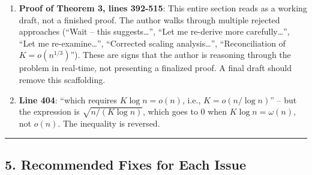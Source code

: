 \documentclass[
  12pt,
]{ctexart}
\begin{document}
\begin{enumerate}
  \textbf{Line 285}: The author writes ``For a fixed true center
  \(\mu_k\), let \(j^*(k) = \arg\min_j \|\mu_k - \mu_j'\|_2\)'' -- but
  this ignores that the \(k\)-means assignment is based on
  \(\|\phi(x) - \mu_j'\|_2 = \|\mu_k + \varepsilon - \mu_j'\|_2\), not
  \(\|\mu_k - \mu_j'\|_2\). The argmin depends on \(\varepsilon\), so
  fixing \(j^*\) independent of \(\varepsilon\) is incorrect.
\item
  \textbf{Proof of Theorem 3, lines 392-515}: This entire section reads
  as a working draft, not a finished proof. The author walks through
  multiple rejected approaches (``Wait -- this suggests\ldots{}'', ``Let
  me re-derive more carefully\ldots{}'', ``Let me re-examine\ldots{}'',
  ``Corrected scaling analysis\ldots{}'', ``Reconciliation of
  \(K = o(n^{1/3})\)''). These are signs that the author is reasoning
  through the problem in real-time, not presenting a finalized proof. A
  final draft should remove this scaffolding.
\item
  \textbf{Line 404}: ``which requires \(K \log n = o(n)\), i.e.,
  \(K = o(n / \log n)\)'' -- but the expression is
  \(\sqrt{n/(K \log n)}\), which goes to 0 when
  \(K \log n = \omega(n)\), not \(o(n)\). The inequality is reversed.
\end{enumerate}

\begin{center}\rule{0.5\linewidth}{0.5pt}\end{center}

\subsection{5. Recommended Fixes for Each
Issue}\label{recommended-fixes-for-each-issue}
\end{document}
